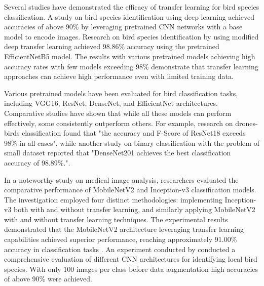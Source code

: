 \documentclass[a4paper,12pt]{report}
\begin{document}
Several studies have demonstrated the efficacy of transfer learning for bird species classification. A study on bird species identification using deep learning achieved accuracies of above 90\% by leveraging pretrained CNN networks with a base model to encode images\citep{Vo2023BirdDA}. Research on bird species identification by \citep{Mochurad2024ANE} using modified deep transfer learning achieved 98.86\% accuracy using the pretrained EfficientNetB5 model. The results with various pretrained models achieving high accuracy rates with few models exceeding 98\% demonstrate that transfer learning approaches can achieve high performance even with limited training data.

Various pretrained models have been evaluated for bird classification tasks, including VGG16, ResNet, DenseNet, and EfficientNet architectures. Comparative studies have shown that while all these models can perform effectively, some consistently outperform others. For example, research on drones-birds classification found that "the accuracy and F-Score of ResNet18 exceeds 98\% in all cases"\citep{Mohamed2023EfficientDC}, while another study on binary classification with the problem of small dataset reported that "DenseNet201 achieves the best classification accuracy of 98.89\%."\citep{Ren2023MonkeypoxDD}.

In a noteworthy study on medical image analysis, researchers evaluated the comparative performance of MobileNetV2 and Inception-v3 classification models. The investigation employed four distinct methodologies: implementing Inception-v3 both with and without transfer learning, and similarly applying MobileNetV2 with and without transfer learning techniques. The experimental results demonstrated that the MobileNetV2 architecture leveraging transfer learning capabilities achieved superior performance, reaching approximately 91.00\% accuracy in classification tasks \citep{Rahman2020}. An experiment conducted by \citep{9402686} conducted a comprehensive evaluation of different CNN architectures for identifying local bird species. With only 100 images per class before data augmentation high accuracies of above 90\% were achieved.

\end{document}
